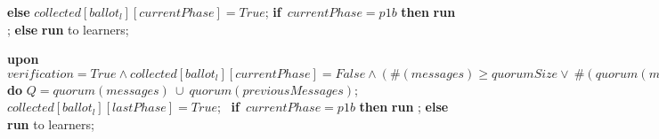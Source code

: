 \begin{algorithm}
\begin{algorithmic}[1]
            
        \State \hspace{\algorithmicindent} \textbf{else}
            \State \hspace{\algorithmicindent}\hspace{\algorithmicindent} $collected[ballot_l][currentPhase] = True$;
            \State \hspace{\algorithmicindent}\hspace{\algorithmicindent} \textbf{if}\ $currentPhase = p1b$ \textbf{then}
            \State \hspace{\algorithmicindent}\hspace{\algorithmicindent}\hspace{\algorithmicindent} 
            \textbf{run} ;
            \State \hspace{\algorithmicindent}\hspace{\algorithmicindent} \textbf{else}
            \State \hspace{\algorithmicindent}\hspace{\algorithmicindent}\hspace{\algorithmicindent} \textbf{run}  to learners;
            
    \State
    \State \textbf{upon} $verification = True \land collected[ballot_l][currentPhase] = False \land (\#(messages) \geq quorumSize \lor\ \#(quorum(messages)\ \cup\ quorum(previousMessages)) \geq n-s)$ \textbf{do}
    \State \hspace{\algorithmicindent} $Q = quorum(messages)\ \cup\ quorum(previousMessages)$;
    \State \hspace{\algorithmicindent} $collected[ballot_l][lastPhase] = True$;
    \State\ \hspace{\algorithmicindent}\textbf{if}\ $currentPhase = p1b$ \textbf{then}
            \State \hspace{\algorithmicindent}\hspace{\algorithmicindent} 
            \textbf{run} ;
            \State \hspace{\algorithmicindent} \textbf{else}
            \State \hspace{\algorithmicindent}\hspace{\algorithmicindent} \textbf{run}  to learners;

\end{algorithmic}
\end{algorithm}

